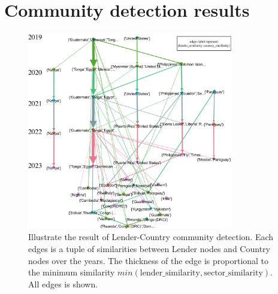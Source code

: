 \chapter{Community detection results}

\begin{figure}[H]
	\centering
	\includegraphics[width=0.8\textwidth]{images/LCountry-full.pdf}
	\caption[Illustrate the result of Lender-Country community detection]{
		Illustrate the result of Lender-Country community detection.
		Each edges is a tuple of similarities between Lender nodes and Country nodes over the years.
		The thickness of the edge is proportional to the minimum similarity $min(\text{lender\_similarity}, \text{sector\_similarity})$.
		All edges is shown.
	}
	\label{fig:appendix-LCountry-full}
\end{figure}
